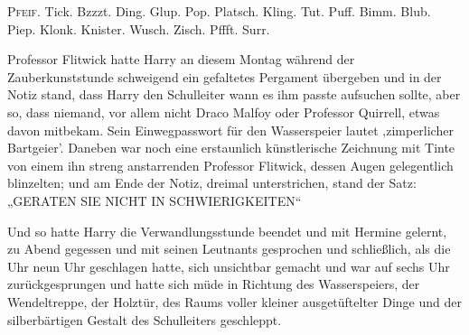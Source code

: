 

\lettrine{P}{feif.} Tick. Bzzzt. Ding. Glup. Pop. Platsch. Kling. Tut. Puff. Bimm. Blub. Piep. Klonk. Knister. Wusch. Zisch. Pffft. Surr.

Professor Flitwick hatte Harry an diesem Montag während der Zauberkunststunde schweigend ein gefaltetes Pergament übergeben und in der Notiz stand, dass Harry den Schulleiter wann es ihm passte aufsuchen sollte, aber so, dass niemand, vor allem nicht Draco Malfoy oder Professor Quirrell, etwas davon mitbekam. Sein Einwegpasswort für den Wasserspeier lautet ‚zimperlicher Bartgeier’.%
Daneben war noch eine erstaunlich künstlerische Zeichnung mit Tinte von einem ihn streng anstarrenden Professor Flitwick, dessen Augen gelegentlich blinzelten; und am Ende der Notiz, dreimal unterstrichen, stand der Satz: „GERATEN SIE NICHT IN SCHWIERIGKEITEN“

Und so hatte Harry die Verwandlungsstunde beendet und mit Hermine gelernt, zu Abend gegessen und mit seinen Leutnants gesprochen und schließlich, als die Uhr neun Uhr geschlagen hatte, sich unsichtbar gemacht und war auf sechs Uhr zurückgesprungen und hatte sich müde in Richtung des Wasserspeiers, der Wendeltreppe, der Holztür, des Raums voller kleiner ausgetüftelter Dinge und der silberbärtigen Gestalt des Schulleiters geschleppt.


